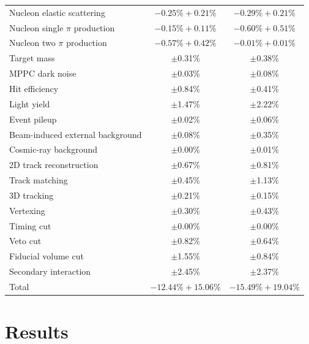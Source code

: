 \documentclass[%
 reprint,
superscriptaddress,
 amsmath,amssymb,
 aps,
]{revtex4-1}
\begin{document}
\begin{table}[htbp]
\begin{center}
\begin{tabular}{lcc}
Nucleon elastic scattering&$-0.25\%+0.21\%$&$-0.29\%+0.21\%$\\
Nucleon single $\pi$ production &$-0.15\%+0.11\%$&$-0.60\%+0.51\%$\\
Nucleon two $\pi$ production &$-0.57\%+0.42\%$&$-0.01\%+0.01\%$\\
\hline
Target mass&$\pm$0.31\%&$\pm$0.38\%\\
MPPC dark noise&$\pm$0.03\%&$\pm$0.08\%\\
Hit efficiency&$\pm$0.84\%&$\pm$0.41\%\\
Light yield&$\pm$1.47\%&$\pm$2.22\%\\
Event pileup&$\pm$0.02\%&$\pm$0.06\%\\
Beam-induced external background&$\pm$0.08\%&$\pm$0.35\%\\
Cosmic-ray background&$\pm$0.00\%&$\pm$0.01\%\\
2D track reconstruction&$\pm$0.67\%&$\pm$0.81\%\\
Track matching&$\pm$0.45\%&$\pm$1.13\%\\
3D tracking&$\pm$0.21\%&$\pm$0.15\%\\
Vertexing&$\pm$0.30\%&$\pm$0.43\%\\
Timing cut&$\pm$0.00\%&$\pm$0.00\%\\
Veto cut&$\pm$0.82\%&$\pm$0.64\%\\
Fiducial volume cut&$\pm$1.55\%&$\pm$0.84\%\\
Secondary interaction&$\pm$2.45\%&$\pm$2.37\%\\
\hline
Total&$-12.44\%+15.06\%$&$-15.49\%+19.04\%$\\
\hline \hline
\end{tabular}
\label{ccqe_syst}
  \end{center}
\end{table}








\section{Results}\label{sec:result}
\end{document}
